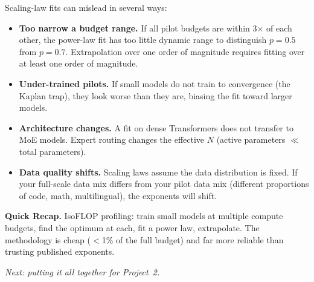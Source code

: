Scaling-law fits can mislead in several ways:

\begin{itemize}[nosep]
  \item \textbf{Too narrow a budget range.} If all pilot budgets are within 3$\times$ of each other, the power-law fit has too little dynamic range to distinguish $p = 0.5$ from $p = 0.7$. Extrapolation over one order of magnitude requires fitting over at least one order of magnitude.
  \item \textbf{Under-trained pilots.} If small models do not train to convergence (the Kaplan trap), they look worse than they are, biasing the fit toward larger models.
  \item \textbf{Architecture changes.} A fit on dense Transformers does not transfer to MoE models. Expert routing changes the effective $N$ (active parameters $\ll$ total parameters).
  \item \textbf{Data quality shifts.} Scaling laws assume the data distribution is fixed. If your full-scale data mix differs from your pilot data mix (different proportions of code, math, multilingual), the exponents will shift.
\end{itemize}

\noindent{}


\begin{quickrecap}
\textbf{Quick Recap.} IsoFLOP profiling: train small models at multiple compute budgets, find the optimum at each, fit a power law, extrapolate. The methodology is cheap ($<$1\% of the full budget) and far more reliable than trusting published exponents.

\textit{Next: putting it all together for Project~2.}
\end{quickrecap}



